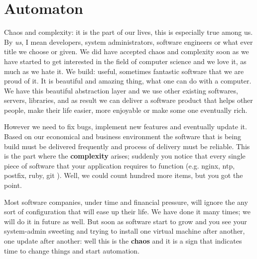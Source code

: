 \documentclass[10pt]{book}
\begin{document}
\begin{latexonly}
\tableofcontents
\clearemptydoublepage
\end{latexonly}








\mainmatter

\chapter{Automaton}
Chaos and complexity: it is the part of our lives, this is especially true among 
us. By \emph{us}, I mean developers, system administrators, software engineers or what ever title we 
choose or given. We did have accepted chaos and complexity soon as we have 
started to get interested in the field of computer science and we love it, as 
much as we hate it. We build: useful, sometimes fantastic software that we are proud of it. 
It is beautiful and amazing thing, what one can do with a computer. 
We have this beautiful abstraction layer and we use other existing softwares, servers, 
libraries, and as result we can deliver a software product that helps other people, make their life easier, 
more enjoyable or make some one eventually rich. 

However we need to fix bugs, implement new features and eventually update it.
Based on our economical and business environment the software that is being 
build must be delivered frequently and process of delivery must be reliable. 
This is the part where the {\bf complexity} arises; suddenly you notice that every 
single piece of software that your application requires to function (e.g. nginx, ntp, postfix, ruby, git ). 
Well, we could count hundred more items, but you got the point. 

Most software companies, under time and financial pressure, will ignore the any sort of 
configuration that will ease up their life. We have done it many times; we will do it in future as well. 
But soon as software start to grow and you see your system-admin sweeting and trying to 
install one virtual machine after another, one update after another: 
well this is the {\bf chaos} and it is a sign that indicates time to change things and start automation.
\end{document}
